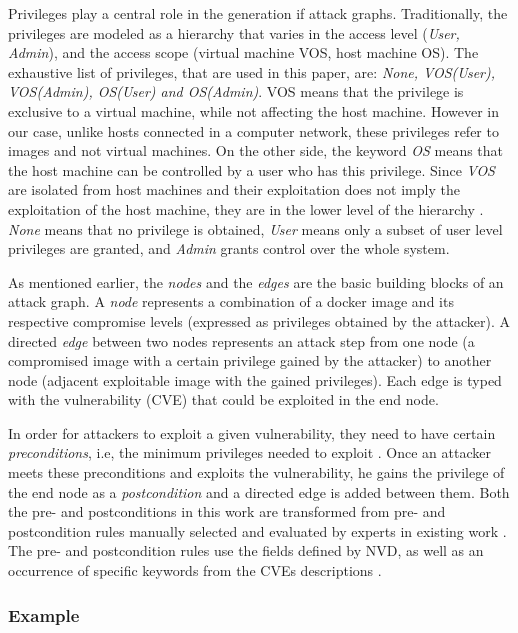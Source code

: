 Privileges play a central role in the generation if attack graphs. Traditionally, the privileges are modeled as a hierarchy that varies in the access level (\textit{User, Admin}), and the access scope (virtual machine VOS, host machine OS). The exhaustive list of privileges, that are used in this paper, are: \textit{None, VOS(User), VOS(Admin), OS(User) and OS(Admin)}. VOS means that the privilege is exclusive to a virtual machine, while not affecting the host machine. However in our case, unlike hosts connected in a computer network, these privileges refer to images and not virtual machines. On the other side, the keyword \textit{OS} means that the  host machine can be controlled by a user who has this privilege. Since \textit{VOS} are isolated from host machines and their exploitation does not imply the exploitation of the host machine, they are in the lower level of the hierarchy \cite{aksu2018automated}. \textit{None} means that no privilege is obtained, \textit{User} means only a subset of user level privileges are granted, and \textit{Admin} grants control over the whole system.

As mentioned earlier, the \textit{nodes} and the \textit{edges} are the basic building blocks of an attack graph. A \textit{node} represents  a combination of a docker image and its respective compromise levels (expressed as privileges obtained by the attacker). A directed \textit{edge} between two nodes represents an attack step from one node (a compromised image with a certain privilege gained by the attacker) to another node (adjacent exploitable image with the gained privileges). Each edge is typed with the vulnerability (CVE) that could be exploited in the end node.

In order for attackers to exploit a given vulnerability, they need to have certain \textit{preconditions}, i.e, the minimum privileges needed to exploit \cite{aksu2018automated}. Once an attacker meets these preconditions and exploits the vulnerability, he gains the privilege of the end node as a \textit{postcondition} and a directed edge is added between them. Both the pre- and postconditions in this work are transformed from pre- and postcondition rules manually selected and evaluated by experts in existing work \cite{aksu2018automated}. The pre- and postcondition rules use the fields defined by NVD, as well as an occurrence of specific keywords from the CVEs descriptions \cite{booth2013national}.

\subsubsection{Example}

